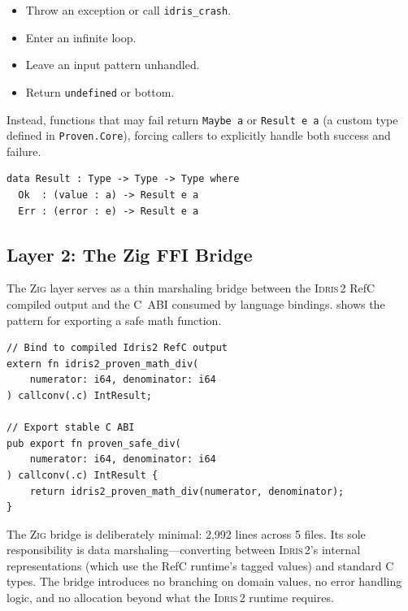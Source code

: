\documentclass[11pt,a4paper]{article}
\newcommand{\idris}{\textsc{Idris\,2}}
\newcommand{\zig}{\textsc{Zig}}
\newcommand{\code}[1]{\texttt{#1}}
\begin{document}
\begin{itemize}[nosep]
  \item Throw an exception or call \code{idris\_crash}.
  \item Enter an infinite loop.
  \item Leave an input pattern unhandled.
  \item Return \code{undefined} or bottom.
\end{itemize}

Instead, functions that may fail return \code{Maybe a} or
\code{Result e a} (a custom type defined in \code{Proven.Core}),
forcing callers to explicitly handle both success and failure.

\begin{lstlisting}[language=Idris2, caption={The \code{Result} type from
\code{Proven.Core}, analogous to Rust's \code{Result} or Haskell's
\code{Either} but defined within the dependently typed core.},
label=lst:result]
data Result : Type -> Type -> Type where
  Ok  : (value : a) -> Result e a
  Err : (error : e) -> Result e a
\end{lstlisting}

\subsection{Layer 2: The Zig FFI Bridge}
\label{sec:layer2}

The \zig{} layer serves as a thin marshaling bridge between the \idris{}
RefC compiled output and the C~ABI consumed by language bindings.
 shows the pattern for exporting a safe math
function.

\begin{lstlisting}[language=Zig, caption={Zig FFI bridge for safe
division. The \code{extern fn} declaration binds to compiled \idris{}
output; the \code{export fn} exposes a C-callable interface.
No division logic exists in this layer.}, label=lst:zig-bridge]
// Bind to compiled Idris2 RefC output
extern fn idris2_proven_math_div(
    numerator: i64, denominator: i64
) callconv(.c) IntResult;

// Export stable C ABI
pub export fn proven_safe_div(
    numerator: i64, denominator: i64
) callconv(.c) IntResult {
    return idris2_proven_math_div(numerator, denominator);
}
\end{lstlisting}

The \zig{} bridge is deliberately minimal: 2,992 lines across 5 files.
Its sole responsibility is data marshaling---converting between \idris{}'s
internal representations (which use the RefC runtime's tagged values) and
standard C types. The bridge introduces no branching on domain values,
no error handling logic, and no allocation beyond what the \idris{}
runtime requires.
\end{document}
